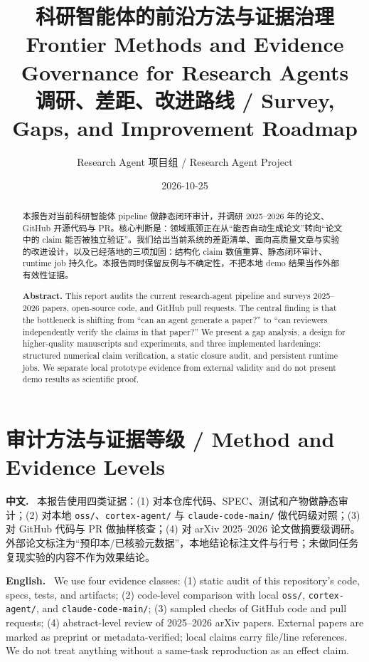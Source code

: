 \documentclass[UTF8,11pt]{ctexart}
\title{\bfseries 科研智能体的前沿方法与证据治理\\[2pt]
\large Frontier Methods and Evidence Governance for Research Agents\\[6pt]
\normalsize 调研、差距、改进路线 / Survey, Gaps, and Improvement Roadmap}
\author{Research Agent 项目组 / Research Agent Project}
\date{2026-10-25}
\newcommand{\zh}{\par\noindent\textbf{中文.}\ }
\newcommand{\en}{\par\noindent\textbf{English.}\ }
\begin{document}
\maketitle
\begin{abstract}
\noindent
本报告对当前科研智能体 pipeline 做静态闭环审计，并调研 2025--2026 年的论文、GitHub 开源代码与 PR。核心判断是：领域瓶颈正在从“能否自动生成论文”转向“论文中的 claim 能否被独立验证”。我们给出当前系统的差距清单、面向高质量文章与实验的改进设计，以及已经落地的三项加固：结构化 claim 数值重算、静态闭环审计、runtime job 持久化。本报告同时保留反例与不确定性，不把本地 demo 结果当作外部有效性证据。

\noindent\textbf{Abstract.} This report audits the current research-agent pipeline and surveys 2025--2026 papers, open-source code, and GitHub pull requests. The central finding is that the bottleneck is shifting from ``can an agent generate a paper?'' to ``can reviewers independently verify the claims in that paper?'' We present a gap analysis, a design for higher-quality manuscripts and experiments, and three implemented hardenings: structured numerical claim verification, a static closure audit, and persistent runtime jobs. We separate local prototype evidence from external validity and do not present demo results as scientific proof.
\end{abstract}

\tableofcontents
\newpage

\section{审计方法与证据等级 / Method and Evidence Levels}

\zh
本报告使用四类证据：(1) 对本仓库代码、SPEC、测试和产物做静态审计；(2) 对本地 \texttt{oss/}、\texttt{cortex-agent/} 与 \texttt{claude-code-main/} 做代码级对照；(3) 对 GitHub 代码与 PR 做抽样核查；(4) 对 arXiv 2025--2026 论文做摘要级调研。外部论文标注为“预印本/已核验元数据”，本地结论标注文件与行号；未做同任务复现实验的内容不作为效果结论。
\en
We use four evidence classes: (1) static audit of this repository's code, specs, tests, and artifacts; (2) code-level comparison with local \texttt{oss/}, \texttt{cortex-agent/}, and \texttt{claude-code-main/}; (3) sampled checks of GitHub code and pull requests; (4) abstract-level review of 2025--2026 arXiv papers. External papers are marked as preprint or metadata-verified; local claims carry file/line references. We do not treat anything without a same-task reproduction as an effect claim.
\end{document}
